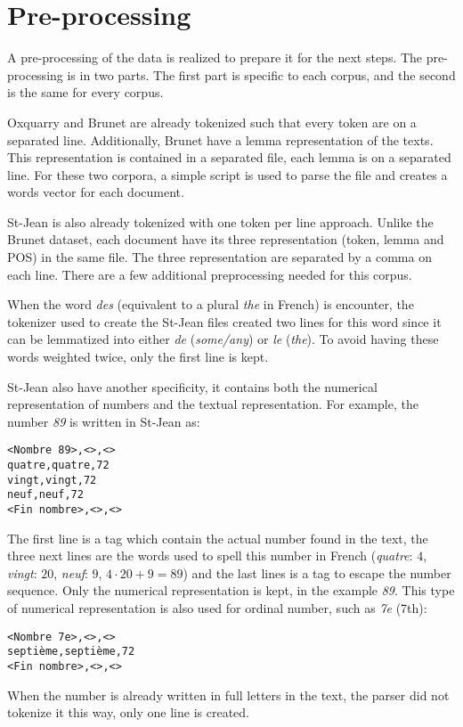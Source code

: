 \section{Pre-processing}

A pre-processing of the data is realized to prepare it for the next steps.
The pre-processing is in two parts.
The first part is specific to each corpus, and the second is the same for every corpus.

Oxquarry and Brunet are already tokenized such that every token are on a separated line.
Additionally, Brunet have a lemma representation of the texts.
This representation is contained in a separated file, each lemma is on a separated line.
For these two corpora, a simple script is used to parse the file and creates a words vector for each document.

St-Jean is also already tokenized with one token per line approach.
Unlike the Brunet dataset, each document have its three representation (token, lemma and POS) in the same file.
The three representation are separated by a comma on each line.
There are a few additional preprocessing needed for this corpus.

When the word \textit{des} (equivalent to a plural \textit{the} in French) is encounter, the tokenizer used to create the St-Jean files created two lines for this word since it can be lemmatized into either \textit{de} (\textit{some/any}) or \textit{le} (\textit{the}).
To avoid having these words weighted twice, only the first line is kept.

St-Jean also have another specificity, it contains both the numerical representation of numbers and the textual representation.
For example, the number \textit{89} is written in St-Jean as:
\begin{verbatim}
<Nombre 89>,<>,<>
quatre,quatre,72
vingt,vingt,72
neuf,neuf,72
<Fin nombre>,<>,<>
\end{verbatim}
The first line is a tag which contain the actual number found in the text, the three next lines are the words used to spell this number in French (\textit{quatre}: $4$, \textit{vingt}: $20$, \textit{neuf}: $9$, $4 \cdot 20 + 9 = 89$) and the last lines is a tag to escape the number sequence.
Only the numerical representation is kept, in the example \textit{89}.
This type of numerical representation is also used for ordinal number, such as \textit{7e} (7th):
\begin{verbatim}
<Nombre 7e>,<>,<>
septième,septième,72
<Fin nombre>,<>,<>
\end{verbatim}
When the number is already written in full letters in the text, the parser did not tokenize it this way, only one line is created.

